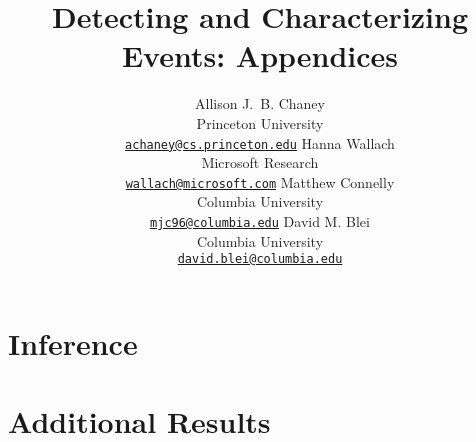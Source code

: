 \documentclass[11pt,letterpaper]{article}
\title{Detecting and Characterizing Events: Appendices}
\author{
Allison J.~B. Chaney\\
    Princeton University\\
	\href{mailto:achaney@cs.princeton.edu}{\nolinkurl{achaney@cs.princeton.edu}}
\And
Hanna Wallach\\
    Microsoft Research\\
    \href{mailto:wallach@microsoft.com}{\nolinkurl{wallach@microsoft.com}}
\AND
Matthew Connelly\\
    Columbia University\\
    \href{mailto:mjc96@columbia.edu}{\nolinkurl{mjc96@columbia.edu}}
\And
David M. Blei\\
    Columbia University\\
    \href{mailto:david.blei@columbia.edu}{\nolinkurl{david.blei@columbia.edu}}
}
\date{}
\begin{document}
\begin{multicols}{2}
\maketitle
\end{multicols}

\appendix
\section{Inference}
\label{sec:inference}


\section{Additional Results}
\label{sec:additional_results}




\end{document}
